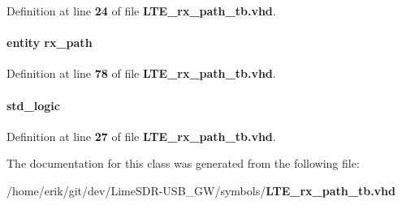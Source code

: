 Definition at line {\bf 24} of file {\bf L\+T\+E\+\_\+rx\+\_\+path\+\_\+tb.\+vhd}.

\paragraph[{lte\+\_\+rx\+\_\+path\+\_\+inst}]{ {\bfseries \textcolor{keywordflow}{entity}\textcolor{vhdlchar}{ }\textcolor{vhdlchar}{rx\+\_\+path}\textcolor{vhdlchar}{ }} \hspace{0.3cm}{\ttfamily [Instantiation]}}\label{classLTE__rx__path__tb_1_1tb__behave_afd4a439c84e2720247e8fb6243b6b4ff}


Definition at line {\bf 78} of file {\bf L\+T\+E\+\_\+rx\+\_\+path\+\_\+tb.\+vhd}.

\paragraph[{reset\+\_\+n}]{ {\bfseries \textcolor{comment}{std\+\_\+logic}\textcolor{vhdlchar}{ }} \hspace{0.3cm}{\ttfamily [Signal]}}\label{classLTE__rx__path__tb_1_1tb__behave_a1f070fd63a3a7fa45c907335ea870c5b}


Definition at line {\bf 27} of file {\bf L\+T\+E\+\_\+rx\+\_\+path\+\_\+tb.\+vhd}.



The documentation for this class was generated from the following file\+:\begin{DoxyCompactItemize}
\item 
/home/erik/git/dev/\+Lime\+S\+D\+R-\/\+U\+S\+B\+\_\+\+G\+W/symbols/{\bf L\+T\+E\+\_\+rx\+\_\+path\+\_\+tb.\+vhd}\end{DoxyCompactItemize}
